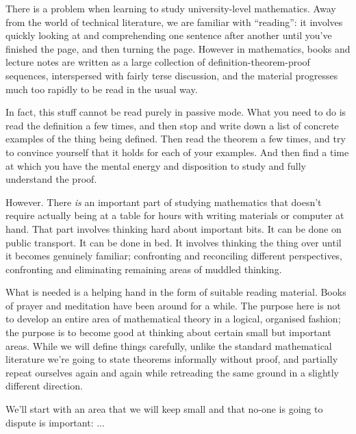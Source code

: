 There is a problem when learning to study university-level mathematics. Away from the world of
technical literature, we are familiar with ``reading'': it involves quickly looking at and
comprehending one sentence after another until you've finished the page, and then turning the
page. However in mathematics, books and lecture notes are written as a large collection of
definition-theorem-proof sequences, interspersed with fairly terse discussion, and the material
progresses much too rapidly to be read in the usual way.

In fact, this stuff cannot be read purely in passive mode.  What you need to do is read the
definition a few times, and then stop and write down a list of concrete examples of the thing being
defined. Then read the theorem a few times, and try to convince yourself that it holds for each of
your examples. And then find a time at which you have the mental energy and disposition to study
and fully understand the proof.

However. There {\it is} an important part of studying mathematics that doesn't require actually
being at a table for hours with writing materials or computer at hand. That part involves thinking
hard about important bits. It can be done on public transport. It can be done in bed. It involves
thinking the thing over until it becomes genuinely familiar; confronting and reconciling different
perspectives, confronting and eliminating remaining areas of muddled thinking.

What is needed is a helping hand in the form of suitable reading material. Books of prayer and
meditation have been around for a while.  The purpose here is not to develop an entire area of
mathematical theory in a logical, organised fashion; the purpose is to become good at thinking
about certain small but important areas. While we will define things carefully, unlike the standard
mathematical literature we're going to state theorems informally without proof, and partially
repeat ourselves again and again while retreading the same ground in a slightly different
direction.

We'll start with an area that we will keep small and that no-one is going to dispute is important:
...


